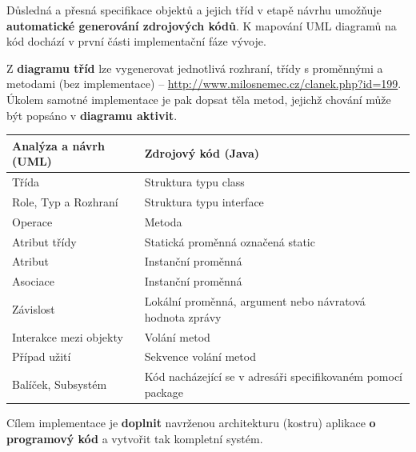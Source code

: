 Důsledná a přesná specifikace {objektů} a jejich {tříd} v etapě návrhu umožňuje\textbf{ automatické generování zdrojových kódů}. K mapování UML diagramů na kód dochází v první části implementační fáze vývoje.

Z \textbf{diagramu tříd} lze vygenerovat jednotlivá rozhraní, třídy s proměnnými a metodami (bez implementace) -- \url{http://www.milosnemec.cz/clanek.php?id=199}. Úkolem samotné implementace je pak dopsat těla metod, jejichž chování může být popsáno v \textbf{diagramu aktivit}.

\begin{table}[H]
	\centering
	\begin{tabular}{|l|l|}
		\hline
		\textbf{Analýza a návrh (UML)} & \textbf{Zdrojový kód (Java)}                                \\ \hline
		Třída                          & Struktura typu class                                        \\ \hline
		Role, Typ a Rozhraní           & Struktura typu interface                                    \\ \hline
		Operace                        & Metoda                                                      \\ \hline
		Atribut třídy                  & Statická proměnná označená static                           \\ \hline
		Atribut                        & Instanční proměnná                                          \\ \hline
		Asociace                       & Instanční proměnná                                          \\ \hline
		Závislost                      & Lokální proměnná, argument nebo návratová hodnota zprávy    \\ \hline
		Interakce mezi objekty         & Volání metod                                                \\ \hline
		Případ užití                   & Sekvence volání metod                                       \\ \hline
		Balíček, Subsystém             & Kód nacházející se v adresáři specifikovaném pomocí package \\ \hline
	\end{tabular}
\end{table}

Cílem implementace je \textbf{doplnit} navrženou architekturu (kostru) aplikace \textbf{o programový kód} a vytvořit tak kompletní systém.


